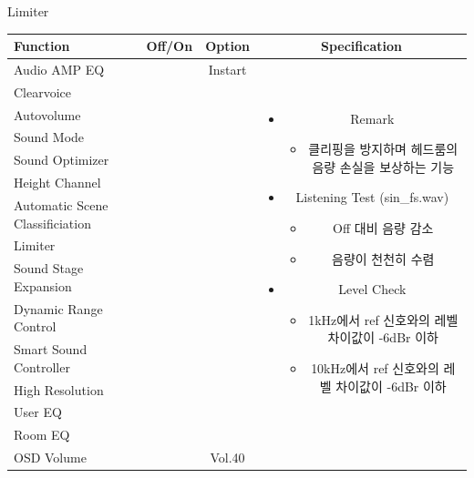 \documentclass{beamer}
\begin{document}
\begin{frame}[t]{Limiter}
\begin{tiny}
\begin{tabular}{@{}lccc@{}}
\toprule
Function & Off/On & Option & Specification \\
\midrule
Audio AMP EQ & \color{black}{Off} & Instart &
\multirow{14}{60mm}{
\begin{itemize}
\item Remark
	\begin{itemize}
	\item 클리핑을 방지하며 헤드룸의 음량 손실을 보상하는 기능
	\end{itemize}
\item Listening Test (sin\_fs.wav)
	\begin{itemize}
	\item Off 대비 음량 감소
	\item 음량이 천천히 수렴
	\end{itemize}
\item Level Check
  \begin{itemize}
  \item 1kHz에서 ref 신호와의 레벨 차이값이 -6dBr 이하
  \item 10kHz에서 ref 신호와의 레벨 차이값이 -6dBr 이하
  \end{itemize}
\end{itemize}
} \\
Clearvoice & \color{black}{Off} & & \\
Autovolume & \color{black}{Off} & & \\
Sound Mode & \color{black}{Off} & & \\
Sound Optimizer & \color{black}{Off} & & \\
Height Channel & \color{black}{Off} & & \\
Automatic Scene Classificiation & \color{black}{Off} & & \\
Limiter & \color{blue}{On} & & \\
Sound Stage Expansion & \color{black}{Off} & & \\
Dynamic Range Control & \color{black}{Off} & & \\
Smart Sound Controller & \color{black}{Off} & & \\
High Resolution & \color{black}{Off} & & \\
User EQ & \color{black}{Off} & & \\
Room EQ & \color{black}{Off} & & \\
OSD Volume & \color{blue}{On} & Vol.40 & \\
\midrule
\end{tabular}
\end{tiny}

\end{frame}
\end{document}
